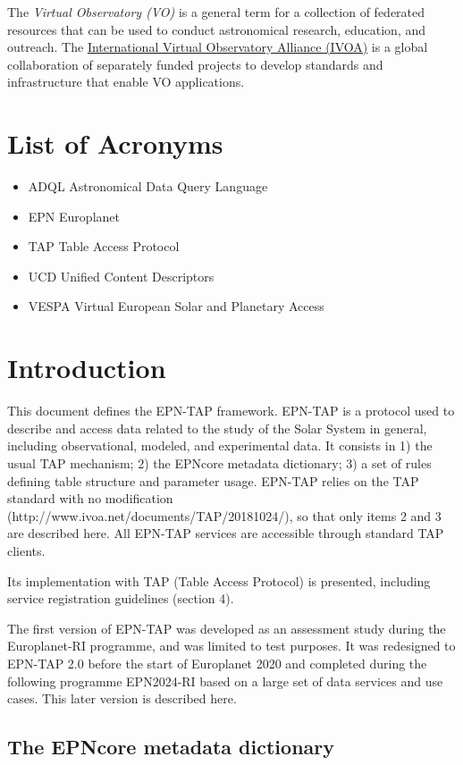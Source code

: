 \documentclass[11pt,a4paper]{ivoa}
\begin{document}
The \emph{Virtual Observatory (VO)} is a
general term for a collection of federated resources that can be used
to conduct astronomical research, education, and outreach.
The \href{http://www.ivoa.net}{International
Virtual Observatory Alliance (IVOA)} is a global
collaboration of separately funded projects to develop standards and
infrastructure that enable VO applications.

\section*{List of Acronyms}
\begin{itemize}
\item{ADQL} Astronomical Data Query Language
\item{EPN} Europlanet
\item{TAP} Table Access Protocol 
\item{UCD} Unified Content Descriptors
\item{VESPA} Virtual European Solar and Planetary Access
\end{itemize}

\section{Introduction}


This document defines the EPN-TAP framework. EPN-TAP is a protocol used to describe and access data related to the study of the Solar System in general, including observational, modeled, and experimental data. It consists in 1) the usual TAP mechanism; 2) the EPNcore metadata dictionary; 3) a set of rules defining table structure and parameter usage. EPN-TAP relies on the TAP standard with no modification (http://www.ivoa.net/documents/TAP/20181024/), so that only items 2 and 3 are described here. All EPN-TAP services are accessible through standard TAP clients. 

Its implementation with TAP (Table Access Protocol) is presented, including service registration guidelines (section 4). 

The first version of EPN-TAP was developed as an assessment study during the Europlanet-RI programme, and was limited to test purposes. It was redesigned to EPN-TAP 2.0 before the start of Europlanet 2020 and completed during the following programme EPN2024-RI based on a large set of data services and use cases. This later version is described here.


\subsection{The EPNcore metadata dictionary}
\end{document}
